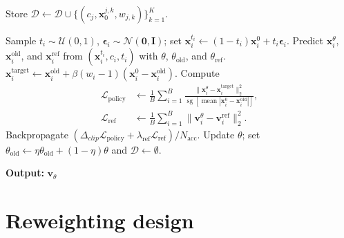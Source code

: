 \documentclass{article} %
\begin{document}
\begin{algorithm}[H]
\begin{algorithmic}[1]
                \State Store
                $\mathcal{D}\leftarrow\mathcal{D}\cup
                \{(c_j,\mathbf{x}_0^{j,k},w_{j,k})\}_{k=1}^{K}$.
            \EndFor

                \State Sample $t_i\sim\mathcal{U}(0,1)$,
                $\boldsymbol{\epsilon}_i\sim\mathcal{N}(\mathbf{0},\mathbf{I})$;
                set $\mathbf{x}_i^{t_i}\leftarrow
                (1-t_i)\mathbf{x}_i^0+t_i\boldsymbol{\epsilon}_i$.
                \State Predict $\mathbf{x}_i^\theta$,
                $\mathbf{x}_i^{\mathrm{old}}$, and $\mathbf{x}_i^{\mathrm{ref}}$
                from $(\mathbf{x}_i^{t_i},c_i,t_i)$ with
                $\theta$, $\theta_{\mathrm{old}}$, and $\theta_{\mathrm{ref}}$.
                \State $\mathbf{x}_i^{\mathrm{target}}\leftarrow
                \mathbf{x}_i^{\mathrm{old}}+
                \beta(w_i-1)(\mathbf{x}_i^0-\mathbf{x}_i^{\mathrm{old}})$.
                \State Compute
                \[
                    \begin{aligned}
                    \mathcal{L}_{\mathrm{policy}}
                    &\leftarrow\frac{1}{B}\sum_{i=1}^{B}
                    \frac{\|\mathbf{x}_i^\theta-\mathbf{x}_i^{\mathrm{target}}\|_2^2}
                    {\operatorname{sg}[\operatorname{mean}
                    |\mathbf{x}_i^0-\mathbf{x}_i^{\mathrm{old}}|]},\\
                    \mathcal{L}_{\mathrm{ref}}
                    &\leftarrow\frac{1}{B}\sum_{i=1}^{B}
                    \|\mathbf{v}_i^\theta-\mathbf{v}_i^{\mathrm{ref}}\|_2^2.
                    \end{aligned}
                \]
                \State Backpropagate
                $(\Delta_{clip}\mathcal{L}_{\mathrm{policy}}+
                \lambda_{\mathrm{ref}}\mathcal{L}_{\mathrm{ref}})/N_{\mathrm{acc}}$.
            \EndFor
            \State Update $\theta$; set
            $\theta_{\mathrm{old}}\leftarrow
            \eta\theta_{\mathrm{old}}+(1-\eta)\theta$ and
            $\mathcal{D}\leftarrow\emptyset$.
        \EndFor
    \end{algorithmic}
    \textbf{Output:} $\mathbf{v}_\theta$
\end{algorithm}







\section{Reweighting design}
\label{sec:group-reweighting}
\end{document}
